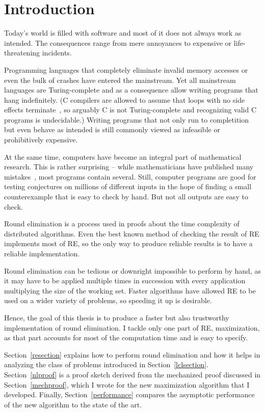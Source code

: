 \documentclass[english, 12pt, a4paper, sci, a-1b, online]{aaltothesis}
\begin{document}
\cleardoublepage{}
\section{Introduction}
\thispagestyle{empty}

Today's world is filled with software and most of it does not always work as intended. The consequences range from mere annoyances to expensive or life-threatening incidents.

Programming languages that completely eliminate invalid memory accesses or even the bulk of crashes have entered the mainstream. Yet all mainstream languages are Turing-complete and as a consequence allow writing programs that hang indefinitely. (C compilers are allowed to assume that loops with no side effects terminate~\cite{C11}, so arguably C is not Turing-complete and recognizing valid C programs is undecidable.) Writing programs that not only run to completition but even behave as intended is still commonly viewed as infeasible or prohibitively expensive.

At the same time, computers have become an integral part of mathematical research. This is rather surprising – while mathematicians have published many mistakes~\cite{itpsurvey}, most programs contain several. Still, computer programs are good for testing conjectures on millions of different inputs in the hope of finding a small counterexample that is easy to check by hand. But not all outputs are easy to check.

Round elimination is a process used in proofs about the time complexity of distributed algorithms. Even the best known method of checking the result of RE implements most of RE, so the only way to produce reliable results is to have a reliable implementation.

Round elimination can be tedious or downright impossible to perform by hand, as it may have to be applied multiple times in succession with every application multiplying the size of the working set. Faster algorithms have allowed RE to be used on a wider variety of problems, so speeding it up is desirable. 

Hence, the goal of this thesis is to produce a faster but also trustworthy implementation of round elimination. I tackle only one part of RE, maximization, as that part accounts for most of the computation time and is easy to specify.

Section~\ref{resection} explains how to perform round elimination and how it helps in analyzing the class of problems introduced in Section~\ref{lclsection}. Section~\ref{nlproof} is a proof sketch derived from the mechanized proof discussed in Section~\ref{mechproof}, which I wrote for the new maximization algorithm that I developed. Finally, Section~\ref{performance} compares the asymptotic performance of the new algorithm to the state of the art.
\end{document}
